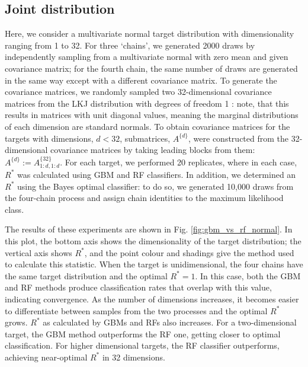 \documentclass[ba]{imsart}
\numberwithin{equation}{section}
\theoremstyle{plain}
\begin{document}
\begin{supplement}
		\subsection{Joint distribution}\label{sec:joint_distribution}
		Here, we consider a multivariate normal target distribution with dimensionality ranging from 1 to 32. For three `chains', we generated 2000 draws by independently sampling from a multivariate normal with zero mean and given covariance matrix; for the fourth chain, the same number of draws are generated in the same way except with a different covariance matrix. To generate the covariance matrices, we randomly sampled two 32-dimensional covariance matrices from the LKJ distribution with degrees of freedom 1 \citep{lewandowski2009generating}: note, that this results in matrices with unit diagonal values, meaning the marginal distributions of each dimension are standard normals. To obtain covariance matrices for the targets with dimensions, $d<32$, submatrices, $A^{\{d\}}$, were constructed from the 32-dimensional covariance matrices by taking leading blocks from them: $A^{\{d\}}:=A^{\{32\}}_{1:d, 1:d}$. For each target, we performed 20 replicates, where in each case, $R^*$ was calculated using GBM and RF classifiers. In addition, we determined an $R^*$ using the Bayes optimal classifier: to do so, we generated 10,000 draws from the four-chain process and assign chain identities to the maximum likelihood class.  
		
		The results of these experiments are shown in Fig. \ref{fig:gbm_vs_rf_normal}. In this plot, the bottom axis shows the dimensionality of the target distribution; the vertical axis shows $R^*$, and the point colour and shadings give the method used to calculate this statistic. When the target is unidimensional, the four chains have the same target distribution and the optimal $R^*=1$. In this case, both the GBM and RF methods produce classification rates that overlap with this value, indicating convergence. As the number of dimensions increases, it becomes easier to differentiate between samples from the two processes and the optimal $R^*$ grows. $R^*$ as calculated by GBMs and RFs also increases. For a two-dimensional target, the GBM method outperforms the RF one, getting closer to optimal classification. For higher dimensional targets, the RF classifier outperforms, achieving near-optimal $R^*$ in 32 dimensions.
		

\end{supplement}
\end{document}
